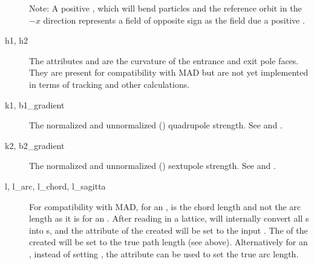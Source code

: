 \begin{description}
Note: A positive , which will bend particles and the reference orbit in the $-x$ direction
represents a field of opposite sign as the field due a positive .
  \item[h1, h2] \Newline
The attributes  and  are the curvature of the entrance and exit pole faces. They are
present for compatibility with MAD but are not yet implemented in terms of tracking and other
calculations.
  \item[k1, b1_gradient] \Newline
The normalized and unnormalized () quadrupole strength. See  and .

  \item[k2, b2_gradient] \Newline
The normalized and unnormalized () sextupole strength. See  and .
  \item[l, l_arc, l_chord, l_sagitta]  \Newline
For compatibility with MAD, for an ,  is the chord length and not the arc length as
it is for an .  After reading in a lattice, \bmad will internally convert all s
into s, and the  attribute of the created  will be set to the input
. The  of the created  will be set to the true path length (see
above). Alternatively for an , instead of setting , the  attribute can be
used to set the true arc length. 


\end{description}
